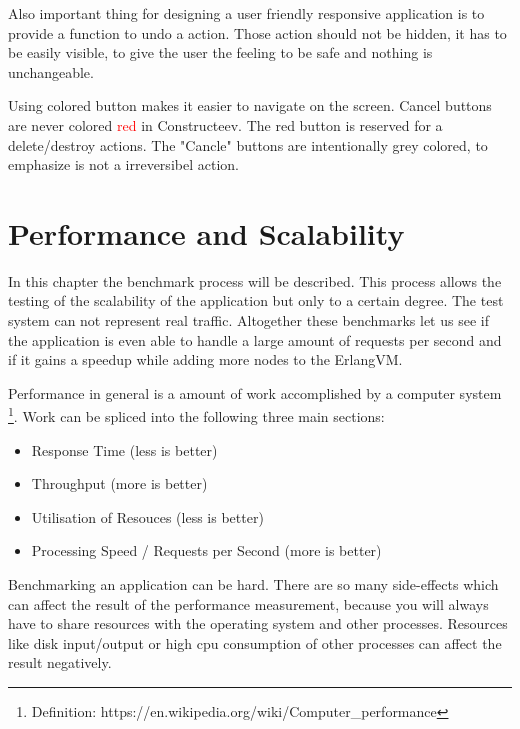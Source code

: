 \textcolor{newcode}{Also important thing for designing a user friendly responsive application is to provide a function to undo a action. Those action should not be hidden, it has to be easily visible, to give the user the feeling to be safe and nothing is unchangeable.}

\textcolor{newcode}{Using colored button makes it easier to navigate on the screen. Cancel buttons are never colored \textcolor{red}{red} in Constructeev. The red button is reserved for a delete/destroy actions. The "Cancle" buttons are intentionally grey colored, to emphasize is not a irreversibel action.}



\chapter{Performance and Scalability} \label{Performance and Scalability}
\label{perf_scale}
In this chapter the benchmark process will be described.
This process allows the testing of the scalability of the application but only to a certain degree. The test system can not represent real traffic. Altogether these benchmarks let us see if the application is even able to handle a large amount of requests per second and if it gains a speedup while adding more nodes to the ErlangVM.

\textcolor{newcode}{Performance in general is a amount of work accomplished by a computer system \footnote{Definition: https://en.wikipedia.org/wiki/Computer\_performance}. Work can be spliced into the following three main sections:}

\begin{itemize}
\item Response Time (less is better)
\item Throughput (more is better)
\item Utilisation of Resouces (less is better)
\item Processing Speed / Requests per Second (more is better)
\end{itemize}


\textcolor{newcode}{Benchmarking an application can be hard. There are so many side-effects which can affect the result of the performance measurement, because you will always have to share resources with the operating system and other processes. Resources like disk input/output or high cpu consumption of other processes can affect the result negatively.}

